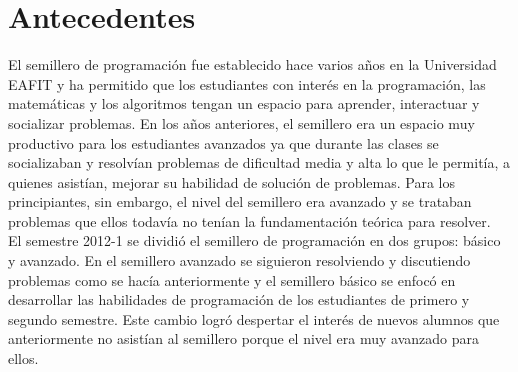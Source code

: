 \documentclass[11pt, oneside]{article}
\theoremstyle{definition}
\theoremstyle{remark}
\begin{document}
\section{Antecedentes}
El semillero de programación fue establecido hace varios años en la Universidad EAFIT y ha permitido que los estudiantes con interés en la programación, las matemáticas y los algoritmos tengan un espacio para aprender, interactuar y socializar problemas. En los años anteriores, el semillero era un espacio muy productivo para los estudiantes avanzados ya que durante las clases se socializaban y resolvían problemas de dificultad media y alta lo que le permitía, a quienes asistían, mejorar su habilidad de solución de problemas. Para los principiantes, sin embargo, el nivel del semillero era avanzado y se trataban problemas que ellos todavía no tenían la fundamentación teórica para resolver.\\
El semestre 2012-1 se dividió el semillero de programación en dos grupos: básico y avanzado. En el semillero avanzado se siguieron resolviendo y discutiendo problemas como se hacía anteriormente y el semillero básico se enfocó en desarrollar las habilidades de programación de los estudiantes de primero y segundo semestre. Este cambio logró despertar el interés de nuevos alumnos que anteriormente no asistían al semillero porque el nivel era muy avanzado para ellos.\\
\end{document}
